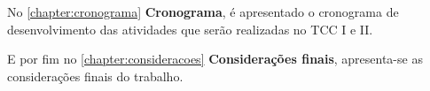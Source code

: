 \par
No \autoref{chapter:cronograma} \textbf{Cronograma}, é apresentado o cronograma de desenvolvimento das atividades que serão realizadas no TCC I e II. %
\par
E por fim no \autoref{chapter:consideracoes} \textbf{Considerações finais}, apresenta-se as considerações finais do trabalho. 
